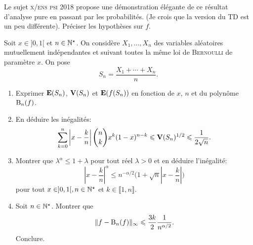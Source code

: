 Le sujet \textsc{x/ens psi 2018} propose une démonstration élégante de ce résultat d'analyse pure en passant par les probabilités. (Je crois que la version du TD est un peu différente).
Préciser les hypothèses sur $f$.
\begin{exercice}        
    Soit $x \in ]0, 1[$ et $n \in \mathbb{N}^\star$. On considère $X_1, \dots, X_n$ des variables aléatoires mutuellement indépendantes et suivant toutes la même loi de \textsc{Bernoulli} de paramètre $x$. On pose
    $$S_n = \frac{X_1 + \cdots + X_n}{n}.$$
    \begin{enumerate}
        \item Exprimer $\mathbf{E}(S_n)$, $\mathbf{V}(S_n)$ et $\mathbf{E}(f(S_n))$ en fonction de $x$, $n$ et du polynôme $\mathrm{B}_n(f)$.
        \item En déduire les inégalités:
        $$\sum_{k=0}^{n} \left| x- \frac{k}{n} \right| \binom{n}{k} x^k (1-x)^{n-k} \leqslant \mathbf{V}(S_n)^{1/2} \leqslant \frac{1}{2\sqrt{n}}.$$
        \item Montrer que $\lambda^\alpha \leqslant 1+\lambda$ pour tout réel $\lambda > 0$ et en déduire l'inégalité:
        $$\left|x-\frac{k}{n} \right|^\alpha \leqslant n^{-\alpha/2} \Bigg(1 + \sqrt{n} \left|x - \frac{k}{n} \right| \Bigg)$$
        pour tout $x \in ]0, 1[, n \in \mathbb{N}^\star$ et $k \in \llbracket 1, n \rrbracket$.
        \item Soit $n \in \mathbb{N}^\star$. Montrer que 
        $$\Vert f-\mathrm{B}_n(f) \Vert_\infty \leqslant \frac{3k}{2} \frac{1}{n^{\alpha/2}}.$$
        Conclure.
    \end{enumerate}
\end{exercice}